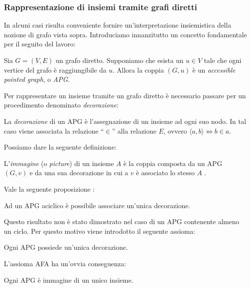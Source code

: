 
\subsubsection{Rappresentazione di insiemi tramite grafi diretti}
\label{sec:graphs_sets}
In alcuni casi risulta conveniente fornire un'in\-ter\-pre\-ta\-zio\-ne insiemistica della nozione di grafo vista sopra. Introduciamo innanzitutto un concetto fondamentale per il seguito del lavoro:
\begin{definition}
    Sia $G = (V, E)$ un grafo diretto. Supponiamo che esista un $u \in V$ tale che ogni vertice del grafo è raggiungibile da $u$. Allora la coppia $(G, u)$ è un \emph{accessible pointed graph}, o \emph{APG}.
\end{definition}

Per rappresentare un insieme tramite un grafo diretto è necessario passare per un procedimento denominato \emph{decorazione}:
\begin{definition}
    La \emph{decorazione} di un APG è l'assegnazione di un insieme ad ogni suo nodo. In tal caso viene associata la relazione ``$\in$'' alla relazione $E$, ovvero $\langle a,b \rangle \iff b \in a$.
\end{definition}

Possiamo dare la seguente definizione:
\begin{definition}
    L'\emph{immagine} (o \emph{picture}) di un insieme $A$ è la coppia composta da un APG $(G,v)$ e da una sua decorazione in cui a $v$ è associato lo stesso $A$ \cite{aczel}.
\end{definition}

Vale la seguente proposizione \cite{aczel}:
\begin{proposition}
    Ad un APG aciclico è possibile associare un'unica decorazione.
\end{proposition}

Questo risultato non è stato dimostrato nel caso di un APG contenente almeno un ciclo. Per questo motivo viene introdotto il seguente assioma:
\begin{axiom}
    Ogni APG possiede un'unica decorazione.
\end{axiom}

L'assioma AFA ha un'ovvia conseguenza:
\begin{corollary}
    Ogni APG è immagine di un unico insieme.
\end{corollary}

